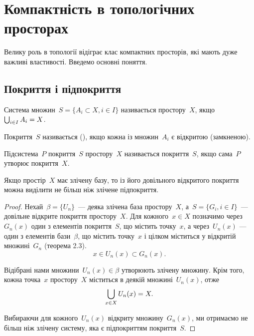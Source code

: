 \chapter{Компактність в топологічних просторах}

Велику роль в топології відіграє клас компактних
просторів, які мають дуже важливі властивості. Введемо
основні поняття.

\section{Покриття і підпокриття}

\begin{definition}
Система множин~$S = \{A_i \subset X, i \in I\}$ називається
 простору~$X$, якщо~$\operatorname*{\bigcup}_{i \in I} A_i = X$.
\end{definition}

\begin{definition}
Покриття~$S$ називається 
(), якщо кожна із множин~$A_i$ є відкритою
(замкненою).
\end{definition}

\begin{definition}
Підсистема~$P$ покриття~$S$ простору~$X$
називається  покриття~$S$, якщо сама~$P$
утворює покриття~$X$.
\end{definition}

\begin{theorem}
[Ліндельоф] Якщо простір~$X$ має злічену
базу, то із його довільного відкритого покриття можна
виділити не більш ніж злічене підпокриття.
\end{theorem}

\begin{proof}
Нехай~$\beta = \{U_n\}$~--- деяка злічена база
простору~$X$, а~$S = \{G_i, i \in I\}$~--- довільне відкрите покриття
простору~$X$. Для кожного~$x \in X$ позначимо через~$G_n(x)$ один
з елементів покриття~$S$, що містить точку~$x$, а через~$U_n(x)$ ---
один з елементів бази~$\beta$, що містить точку~$x$ і цілком
міститься у відкритій множині~$G_n$ (теорема 2.3).
\begin{equation*}
x \in U_n(x) \subset G_n(x).
\end{equation*}

Відібрані нами множини~$U_n(x) \in \beta$ утворюють злічену
множину. Крім того, кожна точка~$x$ простору~$X$ міститься в
деякій множині~$U_n(x)$, отже
\begin{equation*}
\operatorname*{\bigcup}_{x \in X} U_n(x) = X.
\end{equation*}

Вибираючи для кожного~$U_n(x)$ відкриту множину~$G_n(x)$,
ми отримаємо не більш ніж злічену систему, яка є
підпокриттям покриття~$S$.
\end{proof}

